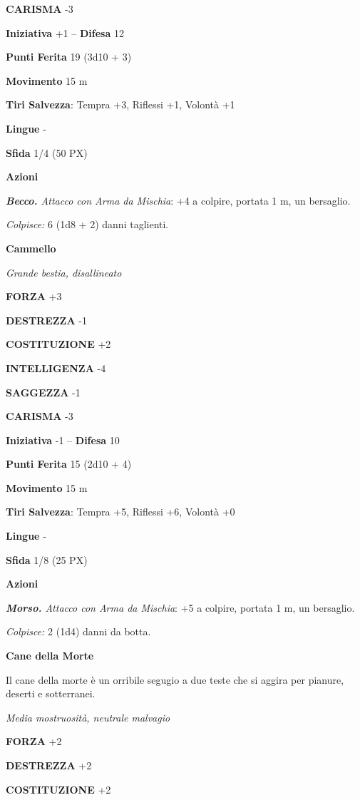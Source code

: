 \begin{multicols}{2}
	\textbf{CARISMA} -3

	\textbf{Iniziativa} +1 -- \textbf{Difesa} 12

	\textbf{Punti Ferita} 19 (3d10 + 3)

	\textbf{Movimento} 15 m

	\textbf{Tiri Salvezza}: Tempra +3, Riflessi +1, Volontà +1

	\textbf{Lingue} -

	\textbf{Sfida} 1/4 (50 PX)

	\textbf{Azioni}

	\textit{\textbf{Becco.} Attacco con Arma da Mischia}: +4 a colpire, portata 1 m, un bersaglio.

	\textit{Colpisce:} 6 (1d8 + 2) danni taglienti.

	\medskip\textbf{Cammello}

	\textit{Grande bestia, disallineato}

	\textbf{FORZA} +3

	\textbf{DESTREZZA} -1

	\textbf{COSTITUZIONE} +2

	\textbf{INTELLIGENZA} -4

	\textbf{SAGGEZZA} -1

	\textbf{CARISMA} -3

	\textbf{Iniziativa} -1 -- \textbf{Difesa} 10

	\textbf{Punti Ferita} 15 (2d10 + 4)

	\textbf{Movimento} 15 m

	\textbf{Tiri Salvezza}: Tempra +5, Riflessi +6, Volontà +0

	\textbf{Lingue} -

	\textbf{Sfida} 1/8 (25 PX)

	\textbf{Azioni}

	\textit{\textbf{Morso.} Attacco con Arma da Mischia}: +5 a colpire, portata 1 m, un bersaglio.

	\textit{Colpisce:} 2 (1d4) danni da botta.

	\medskip\textbf{Cane della Morte}

	Il cane della morte è un orribile segugio a due teste che si aggira per pianure, deserti e sotterranei.

	\textit{Media mostruosità, neutrale malvagio}

	\textbf{FORZA} +2

	\textbf{DESTREZZA} +2

	\textbf{COSTITUZIONE} +2


\end{multicols}
